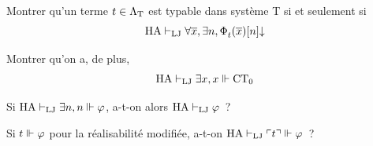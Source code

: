 \begin{problem}

  \begin{pbQuest}
  \item Montrer qu'un terme $t\in\STSet$ est typable dans système T si et
    seulement si
    \[\HA\vdLJ \forall \vec x,\exists n,\TiP{\EnumP{t}{}(\vec x)}{n}\convcal\]
  \item Montrer qu'on a, de plus,
    \[\HA\vdLJ\exists x, x\real \CTZ\]
  \item Si $\HA\vdLJ\exists n, n\real \varFF$, a-t-on
    alors $\HA\vdLJ\varFF$~?
  \item Si $t\real \varFF$ pour la réalisabilité modifiée, a-t-on
    $\HA\vdLJ\godcod{t}\real \varFF$~?
  \end{pbQuest}
\end{problem}
